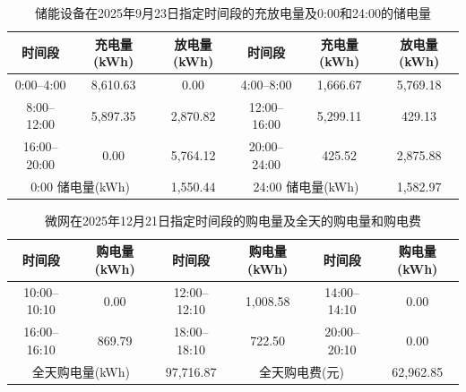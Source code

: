 \begin{table}[H]
  \centering
  \caption{储能设备在2025年9月23日指定时间段的充放电量及0:00和24:00的储电量}
  \label{tab:q2-storage-0923}
  \small
  \renewcommand{\arraystretch}{1.3}
  \begin{tabular}{|c|c|c|c|c|c|}
    \hline
    时间段 & 充电量(kWh) & 放电量(kWh)
    & 时间段 & 充电量(kWh) & 放电量(kWh) \\
    \hline
    0:00--4:00 & 8{,}610.63 & 0.00
    & 4:00--8:00 & 1{,}666.67 & 5{,}769.18 \\
    \hline
    8:00--12:00 & 5{,}897.35 & 2{,}870.82
    & 12:00--16:00 & 5{,}299.11 & 429.13 \\
    \hline
    16:00--20:00 & 0.00 & 5{,}764.12
    & 20:00--24:00 & 425.52 & 2{,}875.88 \\
    \hline
    \multicolumn{2}{|c|}{0:00 储电量(kWh)}
    & \multicolumn{1}{c|}{1{,}550.44}
    & \multicolumn{2}{c|}{24:00 储电量(kWh)}
    & \multicolumn{1}{c|}{1{,}582.97} \\
    \hline
  \end{tabular}
\end{table}

\begin{table}[H]
  \centering
  \caption{微网在2025年12月21日指定时间段的购电量及全天的购电量和购电费}
  \label{tab:q2-purchase-1221}
  \small
  \renewcommand{\arraystretch}{1.3}
  \begin{tabular}{|c|c|c|c|c|c|}
    \hline
    时间段 & 购电量(kWh) & 时间段 & 购电量(kWh) & 时间段 & 购电量(kWh) \\
    \hline
    10:00--10:10 & 0.00 & 12:00--12:10 & 1{,}008.58 & 14:00--14:10 & 0.00 \\
    \hline
    16:00--16:10 & 869.79 & 18:00--18:10 & 722.50 & 20:00--20:10 & 0.00 \\
    \hline
    \multicolumn{2}{|c|}{全天购电量(kWh)}
    & \multicolumn{1}{c|}{97{,}716.87}
    & \multicolumn{2}{c|}{全天购电费(元)}
    & \multicolumn{1}{c|}{62{,}962.85} \\
    \hline
  \end{tabular}
\end{table}

